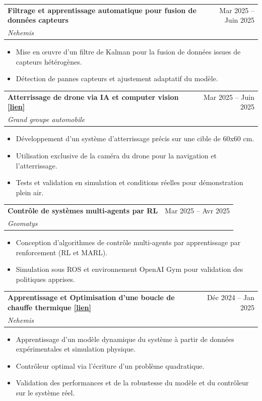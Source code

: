 \documentclass[letterpaper,11pt]{article}
\makeatletter
\newcommand{\resumeItem}[1]{
  \item\small{
    {#1 \vspace{-7pt}}
  }
}
\newcommand{\resumeSubheading}[4]{
  \vspace{-3pt}\item
    \begin{tabular*}{0.97\textwidth}[t]{l@{\extracolsep{\fill}}r}
      \textbf{#1} & #2 \\
      \textit{\small#3} & \textit{\small #4} \\
    \end{tabular*}\vspace{-7pt}
}
\newcommand{\resumeItemListStart}{\begin{itemize}}
\newcommand{\resumeItemListEnd}{\end{itemize}\vspace{-3pt}}
\makeatother
\begin{document}
\resumeSubheading
  {Filtrage et apprentissage automatique pour fusion de données capteurs}{Mar 2025 -- Juin 2025}{Nehemis}{}
  
  \resumeItemListStart
    \resumeItem{Mise en œuvre d’un filtre de Kalman pour la fusion de données issues de capteurs hétérogènes.}
    \vspace{4pt}
    \resumeItem{Détection de pannes capteurs et ajustement adaptatif du modèle.}
  \resumeItemListEnd
  \vspace{6pt}

  
\resumeSubheading
  {Atterrissage de drone via IA et computer vision \href{https://etiennechassaing.com/book/drone_delayed_control/case_study.html}{\small[lien]}}{Mar 2025 -- Juin 2025}{Grand groupe automobile}{}
  
  \resumeItemListStart
    \resumeItem{Développement d'un système d'atterrissage précis sur une cible de 60x60 cm.}
    \vspace{4pt}
    \resumeItem{Utilisation exclusive de la caméra du drone pour la navigation et l'atterrissage.}
    \vspace{4pt}
    \resumeItem{Tests et validation en simulation et conditions réelles pour démonstration plein air.}
  \resumeItemListEnd
  \vspace{6pt}


\resumeSubheading
  {Contrôle de systèmes multi-agents par RL}{Mar 2025 -- Avr 2025}{Geomatys}{}
  
  \resumeItemListStart
    \resumeItem{Conception d’algorithmes de contrôle multi-agents par apprentissage par renforcement (RL et MARL).}
    \vspace{4pt}
    \resumeItem{Simulation sous ROS et environnement OpenAI Gym pour validation des politiques apprises.}
  \resumeItemListEnd
  \vspace{6pt}


\resumeSubheading
  {Apprentissage et Optimisation d’une boucle de chauffe thermique \href{https://etiennechassaing.com/book/heat_pipe_control/system_tutorial.html}{\small[lien]}}{Déc 2024 -- Jan 2025}{Nehemis}{}
  
  \resumeItemListStart
    \resumeItem{Apprentissage d’un modèle dynamique du système à partir de données expérimentales et simulation physique.}
    \vspace{4pt}
    \resumeItem{Contrôleur optimal via l'écriture d'un problème quadratique.}
    \vspace{4pt}
    \resumeItem{Validation des performances et de la robustesse du modèle et du contrôleur sur le système réel.}
  \resumeItemListEnd
  \vspace{6pt}
\end{document}
